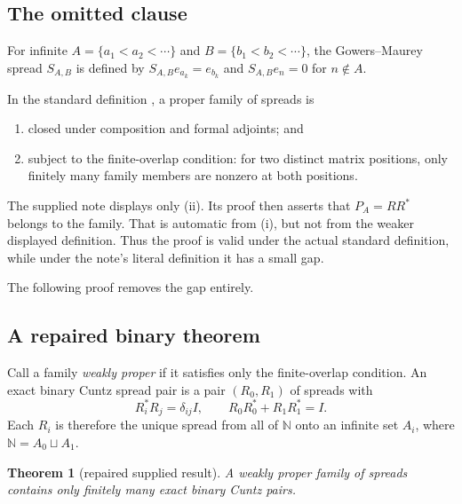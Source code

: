 \documentclass[11pt]{article}
\newtheorem{theorem}{Theorem}[section]
\theoremstyle{definition}
\theoremstyle{remark}
\newcommand{\N}{\mathbb N}
\begin{document}
\subsection{The omitted clause}

For infinite $A=\{a_1<a_2<\cdots\}$ and
$B=\{b_1<b_2<\cdots\}$, the Gowers--Maurey spread $S_{A,B}$ is defined by
$S_{A,B}e_{a_k}=e_{b_k}$ and $S_{A,B}e_n=0$ for $n\notin A$.

In the standard definition \cite[Section 3]{GowersMaurey1997}, a proper family
of spreads is
\begin{enumerate}[label=\textup{(\roman*)}]
\item closed under composition and formal adjoints; and
\item subject to the finite-overlap condition: for two distinct matrix
positions, only finitely many family members are nonzero at both positions.
\end{enumerate}
The supplied note displays only (ii).  Its proof then asserts that
$P_A=R R^*$ belongs to the family.  That is automatic from (i), but not from the
weaker displayed definition.  Thus the proof is valid under the actual standard
definition, while under the note's literal definition it has a small gap.

The following proof removes the gap entirely.

\subsection{A repaired binary theorem}

Call a family \emph{weakly proper} if it satisfies only the finite-overlap
condition.  An exact binary Cuntz spread pair is a pair $(R_0,R_1)$ of spreads
with
\[
 R_i^*R_j=\delta_{ij}I,
 \qquad R_0R_0^*+R_1R_1^*=I.
\]
Each $R_i$ is therefore the unique spread from all of $\N$ onto an infinite set
$A_i$, where $\N=A_0\sqcup A_1$.

\begin{theorem}[repaired supplied result]\label{thm:binary-repair}
A weakly proper family of spreads contains only finitely many exact binary
Cuntz pairs.
\end{theorem}
\end{document}
